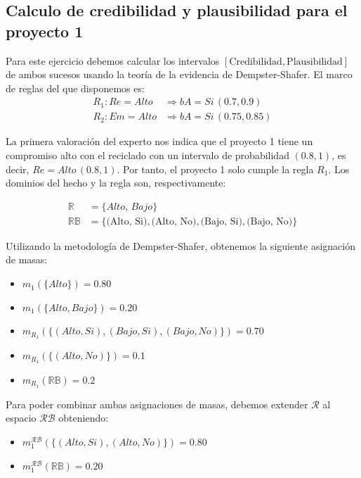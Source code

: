 \documentclass[11pt,a4paper]{article}
\begin{document}
\subsection*{Calculo de credibilidad y plausibilidad para el proyecto 1}

Para  este ejercicio debemos calcular los intervalos $[\text{Credibilidad}, \text{Plausibilidad}]$ de ambos sucesos
usando la teoría de la evidencia de Dempster-Shafer. El marco de reglas del que disponemos es:
\begin{align*}
    R_1: Re=Alto &\Rightarrow bA=Si\,(0.7, 0.9) \\
    R_2: Em=Alto &\Rightarrow bA=Si\,(0.75, 0.85)
\end{align*}

La primera valoración del experto nos indica que el proyecto 1 tiene un compromiso alto con el reciclado
con un intervalo de probabilidad $(0.8, 1)$, es decir, $Re=Alto\, (0.8, 1)$. Por tanto, el proyecto 1 solo cumple la
regla $R_1$. Los dominios del hecho y la regla son, respectivamente:

\begin{align*}
\mathbb{R}&=\{Alto,\, Bajo\} \\
\mathbb{RB}&=\{\text{(Alto, Si)}, \text{(Alto, No)}, \text{(Bajo, Si)}, \text{(Bajo, No)}\}    
\end{align*}

Utilizando la metodología de Dempster-Shafer, obtenemos la siguiente asignación de masas:
\begin{itemize}[leftmargin=2em, topsep=1ex]
    \item $m_{1}(\{Alto\}) = 0.80$
    \item $m_{1}(\{Alto, Bajo\}) = 0.20$
    \item $m_{R_1}(\{(Alto, Si), (Bajo, Si), (Bajo, No)\}) = 0.70$
    \item $m_{R_1}(\{(Alto, No)\}) = 0.1$
    \item $m_{R_1}(\mathbb{RB}) = 0.2$
\end{itemize}

Para poder combinar ambas asignaciones de masas, debemos extender $\mathcal{R}$ al espacio $\mathcal{RB}$ obteniendo:
\begin{itemize}[leftmargin=2em, topsep=1ex]
    \item $m_{1}^{\mathcal{RB}}(\{(Alto, Si), (Alto, No)\}) = 0.80$
    \item $m_{1}^{\mathcal{RB}}(\mathbb{RB}) = 0.20$
\end{itemize}
\end{document}

